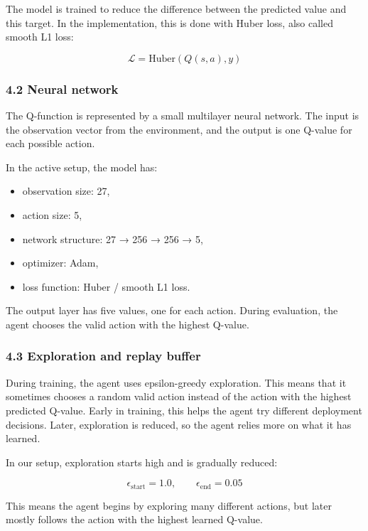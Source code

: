\documentclass[11pt]{article}
\providecommand{\tightlist}{%
      \setlength{\itemsep}{0pt}\setlength{\parskip}{0pt}}
\begin{document}
The model is trained to reduce the difference between the predicted
value and this target. In the implementation, this is done with Huber
loss, also called smooth L1 loss:

\[
\mathcal{L} = \mathrm{Huber}\left(Q(s,a), y\right)
\]

\subsubsection{4.2 Neural network}\label{neural-network}

The Q-function is represented by a small multilayer neural network. The
input is the observation vector from the environment, and the output is
one Q-value for each possible action.

In the active setup, the model has:

\begin{itemize}
\tightlist
\item
  observation size: 27,
\item
  action size: 5,
\item
  network structure: 27 → 256 → 256 → 5,
\item
  optimizer: Adam,
\item
  loss function: Huber / smooth L1 loss.
\end{itemize}

The output layer has five values, one for each action. During
evaluation, the agent chooses the valid action with the highest Q-value.

\subsubsection{4.3 Exploration and replay
buffer}\label{exploration-and-replay-buffer}

During training, the agent uses epsilon-greedy exploration. This means
that it sometimes chooses a random valid action instead of the action
with the highest predicted Q-value. Early in training, this helps the
agent try different deployment decisions. Later, exploration is reduced,
so the agent relies more on what it has learned.

In our setup, exploration starts high and is gradually reduced:

\[
\epsilon_{\text{start}} = 1.0,
\qquad
\epsilon_{\text{end}} = 0.05
\]

This means the agent begins by exploring many different actions, but
later mostly follows the action with the highest learned Q-value.
\end{document}
